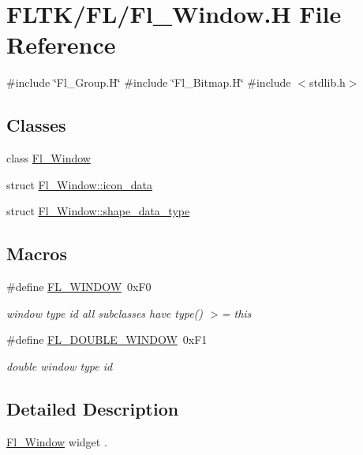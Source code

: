 \hypertarget{_fl___window_8_h}{}\section{F\+L\+T\+K/\+F\+L/\+Fl\+\_\+\+Window.H File Reference}
\label{_fl___window_8_h}
{\ttfamily \#include \char`\"{}Fl\+\_\+\+Group.\+H\char`\"{}}\newline
{\ttfamily \#include \char`\"{}Fl\+\_\+\+Bitmap.\+H\char`\"{}}\newline
{\ttfamily \#include $<$stdlib.\+h$>$}\newline
\subsection*{Classes}
\begin{DoxyCompactItemize}
\item 
class \hyperlink{class_fl___window}{Fl\+\_\+\+Window}
\item 
struct \hyperlink{struct_fl___window_1_1icon__data}{Fl\+\_\+\+Window\+::icon\+\_\+data}
\item 
struct \hyperlink{struct_fl___window_1_1shape__data__type}{Fl\+\_\+\+Window\+::shape\+\_\+data\+\_\+type}
\end{DoxyCompactItemize}
\subsection*{Macros}
\begin{DoxyCompactItemize}
\item 
\#define \hyperlink{_fl___window_8_h_ade2152acce2e38a691be590e8ed68a3c}{F\+L\+\_\+\+W\+I\+N\+D\+OW}~0x\+F0
\begin{DoxyCompactList}\small\item\em window type id all subclasses have type() $>$= this \end{DoxyCompactList}\item 
\#define \hyperlink{_fl___window_8_h_aed8c944bae016f9efd19b639fb2f4cbf}{F\+L\+\_\+\+D\+O\+U\+B\+L\+E\+\_\+\+W\+I\+N\+D\+OW}~0x\+F1
\begin{DoxyCompactList}\small\item\em double window type id \end{DoxyCompactList}\end{DoxyCompactItemize}


\subsection{Detailed Description}
\hyperlink{class_fl___window}{Fl\+\_\+\+Window} widget . 

